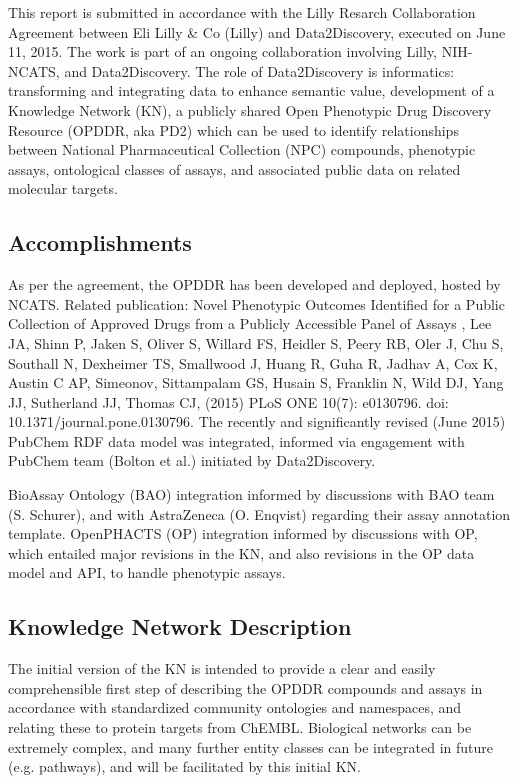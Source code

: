This report is submitted in accordance with the Lilly Resarch Collaboration Agreement between Eli Lilly \& Co (Lilly) and Data2Discovery, executed on June 11, 2015.  The work is part of an ongoing collaboration involving Lilly, NIH-NCATS, and Data2Discovery.  The role of Data2Discovery is informatics: transforming and integrating data to enhance semantic value, development of a Knowledge Network (KN), a publicly shared Open Phenotypic Drug Discovery Resource (OPDDR, aka PD2) which can be used to identify relationships between National Pharmaceutical Collection (NPC) compounds, phenotypic assays, ontological classes of assays, and associated public data on related molecular targets.

\subsection{Accomplishments}

As per the agreement, the OPDDR has been developed and deployed, hosted by NCATS. 
Related publication: Novel Phenotypic Outcomes Identified for a Public Collection of Approved Drugs from a Publicly Accessible Panel of Assays , Lee JA, Shinn P, Jaken S, Oliver S, Willard FS, Heidler S, Peery RB, Oler J, Chu S, Southall N, Dexheimer TS, Smallwood J, Huang R, Guha R, Jadhav A, Cox K, Austin C AP, Simeonov, Sittampalam GS, Husain S, Franklin N, Wild DJ, Yang JJ, Sutherland JJ, Thomas CJ, (2015) PLoS ONE 10(7): e0130796. doi: 10.1371/journal.pone.0130796.
The recently and significantly revised (June 2015) PubChem RDF data model was integrated, informed via engagement with PubChem team (Bolton et al.) initiated by Data2Discovery.

BioAssay Ontology (BAO) integration informed by discussions with BAO team (S. Schurer), and with AstraZeneca (O. Enqvist) regarding their assay annotation template. 
OpenPHACTS (OP) integration informed by discussions with OP, which entailed major revisions in the KN, and also revisions in the OP data model and API, to handle phenotypic assays. 

\subsection{Knowledge Network Description}

The initial version of the KN is intended to provide a clear and easily comprehensible first step of describing the OPDDR compounds and assays in accordance with standardized community ontologies and namespaces, and relating these to protein targets from ChEMBL.  Biological networks can be extremely complex, and many further entity classes can be integrated in future (e.g. pathways), and will be facilitated by this initial KN.

